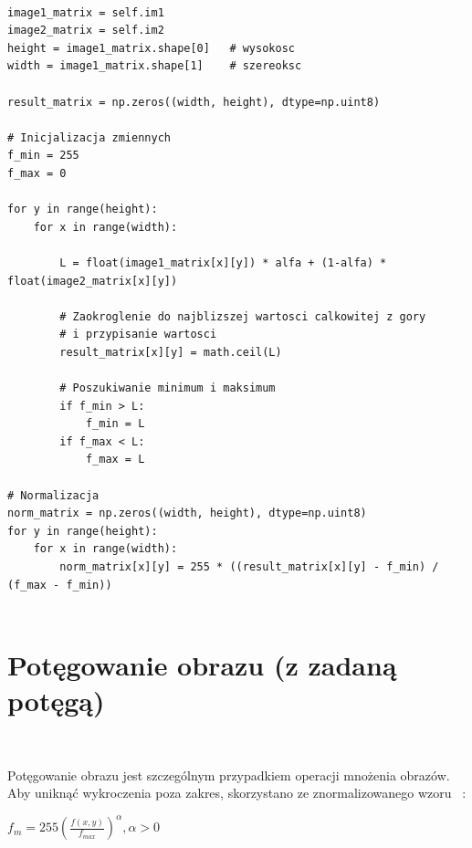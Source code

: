 \documentclass[final,a4paper,openany,12pt]{mwbk}
\begin{document}
\begin{lstlisting}[caption=Mieszanie obrazów szarych z określonym współczynnikiem]

image1_matrix = self.im1
image2_matrix = self.im2
height = image1_matrix.shape[0]   # wysokosc
width = image1_matrix.shape[1]    # szereoksc

result_matrix = np.zeros((width, height), dtype=np.uint8)

# Inicjalizacja zmiennych
f_min = 255
f_max = 0

for y in range(height):
    for x in range(width):  

        L = float(image1_matrix[x][y]) * alfa + (1-alfa) * float(image2_matrix[x][y])

        # Zaokroglenie do najblizszej wartosci calkowitej z gory
        # i przypisanie wartosci
        result_matrix[x][y] = math.ceil(L)

        # Poszukiwanie minimum i maksimum
        if f_min > L:
            f_min = L
        if f_max < L:
            f_max = L

# Normalizacja
norm_matrix = np.zeros((width, height), dtype=np.uint8)
for y in range(height):
    for x in range(width):
        norm_matrix[x][y] = 255 * ((result_matrix[x][y] - f_min) / (f_max - f_min))
        
\end{lstlisting}
\newpage


\section {Potęgowanie obrazu (z zadaną potęgą)}
\hfill\\
\indent

		\begin{center} Potęgowanie obrazu jest szczególnym przypadkiem operacji mnożenia obrazów. Aby uniknąć wykroczenia poza zakres, skorzystano ze znormalizowanego wzoru ~\cite{WykRat}:

		$f_{m} = 255(\frac{f(x,y)}{f_{max}}) ^{\alpha}, \alpha > 0 $
	\end{center}
	
\end{document}
